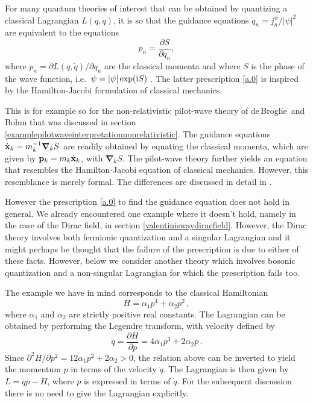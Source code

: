 \documentclass[12pt]{article}
\def\pa{\partial}
\def\al{\alpha}
\def\ii{\textrm i}
\newcommand{\db}{de$\,$Broglie}
\begin{document}
For many quantum theories of interest that can be obtained by quantizing a classical Lagrangian $L(q,{\dot q})$, it is so that the guidance equations ${\dot q}_n = j^\psi_n/|\psi|^2$ are equivalent to the equations
\begin{equation}
p_n = \frac{\partial S }{ \partial q_n},
\label{a.0}
\end{equation}
where $p_n=\partial L(q,{\dot q})/ \partial q_n$ are the classical momenta and where $S$ is the phase of the wave function, i.e.\ $\psi=|\psi|\exp(\ii S)$ \cite{valentini96}. The latter prescription \eqref{a.0} is inspired by the Hamilton-Jacobi formulation of classical mechanics.

This is for example so for the non-relativistic pilot-wave theory of \db\ and Bohm that was discussed in section \ref{examplepilotwaveinterpretationnonrelativistic}. The guidance equations $\dot{ {\bf x}}_k = m^{-1}_k {\boldsymbol{\nabla}}_k S$ are readily obtained by equating the classical momenta, which are given by ${\bf p}_k = m_k {\dot {\bf x}}_k$, with ${\boldsymbol{\nabla}}_k S$. The pilot-wave theory further yields an equation that resembles the Hamilton-Jacobi equation of classical mechanics. However, this resemblance is merely formal. The differences are discussed in detail in \cite[pp.\ 131-134]{holland93b}.
  
However the prescription \eqref{a.0} to find the guidance equation does not hold in general. We already encountered one example where it doesn't hold, namely in the case of the Dirac field, in section \ref{valentiniswaydiracfield}. However, the Dirac theory involves both fermionic quantization and a singular Lagrangian and it might perhaps be thought that the failure of the prescription is due to either of these facts. However, below we consider another theory which involves bosonic quantization and a non-singular Lagrangian for which the prescription fails too.

The example we have in mind corresponds to the classical Hamiltonian 
\begin{equation}
H=\al_1 p^4 + \al_2 p^2\,,
\label{a.1}
\end{equation}
where $\al_1$ and $\al_2$ are strictly positive real constants. The Lagrangian can be obtained by performing the Legendre transform, with velocity defined by 
\begin{equation}
{\dot q} = \frac{\pa H}{\pa p} = 4 \al_1 p^3 + 2 \al_2 p\,.
\label{a.2}
\end{equation}
Since $\pa^2 H/\pa p^2 = 12 \al_1 p^2 + 2 \al_2 > 0$, the relation above can be inverted to yield the momentum $p$ in terms of the velocity ${\dot q}$. The Lagrangian is then given by $L={\dot q}p - H$, where $p$ is expressed in terms of ${\dot q}$. For the subsequent discussion there is no need to give the Lagrangian explicitly.
\end{document}
